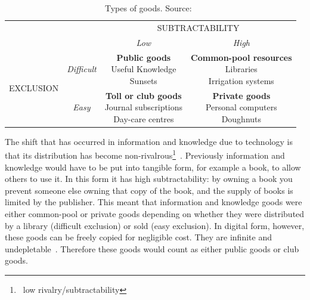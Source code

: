 \begin{table}
\centering
\caption[Types of goods]{Types of goods. Source:~\protect\citet{Hess2007}\label{table:goods}}
\begin{tabular}{cccc}
\multicolumn{2}{c}{} & \multicolumn{2}{c}{SUBTRACTABILITY} \\
\multicolumn{2}{c}{} & \textit{Low} & \textit{High} \\
\hline
\multirow{2}{*}{\begin{sideways}EXCLUSION\end{sideways}} & \textit{Difficult} & \parbox{4cm}{\vspace{.3\baselineskip}\textbf{Public goods}\\
Useful Knowledge\\
Sunsets} & \parbox{4.5cm}{\vspace{.3\baselineskip}\textbf{Common-pool resources}\\
Libraries\\
Irrigation systems} \\[0.6cm]
 & \textit{Easy} & \parbox{4cm}{\vspace{.3\baselineskip}\textbf{Toll or club goods}\\
 Journal subscriptions\\
 Day-care centres} & \parbox{4.5cm}{\vspace{.3\baselineskip}\textbf{Private goods}\\
 Personal computers\\
 Doughnuts} \\[0.7cm]
\end{tabular}
\end{table}

The shift that has occurred in information and knowledge due to technology is that its distribution has become non-rivalrous\footnote{\ie\ low rivalry/subtractability}~\citep{Ostrom2003,Bollier2007}.
Previously information and knowledge would have to be put into tangible form, for example a book, to allow others to use it. 
In this form it has high subtractability: by owning a book you prevent someone else owning that copy of the book, and the supply of books is limited by the publisher. 
This meant that information and knowledge goods were either common-pool or private goods depending on whether they were distributed by a library (difficult exclusion) or sold (easy exclusion). 
In digital form, however, these goods can be freely copied for negligible cost. 
They are infinite and undepletable~\citep{Bollier2007}. 
Therefore these goods would count as either public goods or club goods.


